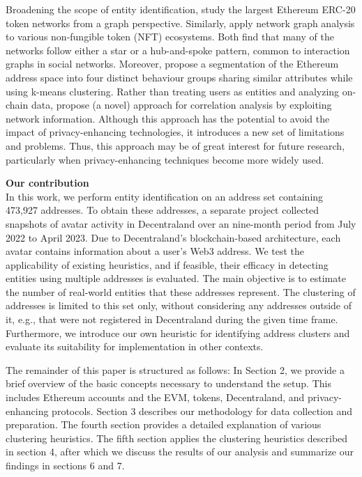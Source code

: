 \documentclass[12pt,a4paper,titlepage,oneside,english]{article}
\begin{document}
Broadening the scope of entity identification, \cite{victorlüders2019} study the largest Ethereum ERC-20 token networks from a graph perspective. Similarly, \cite{casalebrunet2021} apply network graph analysis to various non-fungible token (NFT) ecosystems. Both find that many of the networks follow either a star or a hub-and-spoke pattern, common to interaction graphs in social networks. Moreover, \cite{Payette2017} propose a segmentation of the Ethereum address space into four distinct behaviour groups sharing similar attributes while using k-means clustering. \newline
Rather than treating users as entities and analyzing on-chain data, \cite{yu2023} propose (a novel) approach for correlation analysis by exploiting network information. Although this approach has the potential to avoid the impact of privacy-enhancing technologies, it introduces a new set of limitations and problems. Thus, this approach may be of great interest for future research, particularly when privacy-enhancing techniques become more widely used.


\textbf{Our contribution}\\
In this work, we perform entity identification on an address set containing 473,927 addresses. To obtain these addresses, a separate project collected snapshots of avatar activity in Decentraland over an nine-month period from July 2022 to April 2023. Due to Decentraland's blockchain-based architecture, each avatar contains information about a user's Web3 address. \newline
We test the applicability of existing heuristics, and if feasible, their efficacy in detecting entities using multiple addresses is evaluated.
The main objective is to estimate the number of real-world entities that these addresses represent. The clustering of addresses is limited to this set only, without considering any %
 addresses outside of it, e.g., that were not registered in Decentraland during the given time frame. \newline
Furthermore, we introduce our own heuristic for identifying address clusters and evaluate its suitability for implementation in other contexts.

The remainder of this paper is structured as follows: In Section 2, we provide a brief overview of the basic concepts necessary to understand the setup. This includes Ethereum accounts and the EVM, tokens, Decentraland, and privacy-enhancing protocols. Section 3 describes our methodology for data collection and preparation. The fourth section provides a detailed explanation of various clustering heuristics. The fifth section applies the clustering heuristics described in section 4, after which we discuss the results of our analysis and summarize our findings in sections 6 and 7.
\end{document}
